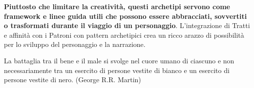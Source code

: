\begin{multicols}{2}
\begin{narratore}
\textbf{Piuttosto che limitare la creatività, questi archetipi servono come framework e linee guida utili che possono essere abbracciati, sovvertiti o trasformati durante il viaggio di un personaggio}. L'integrazione di Tratti e affinità con i Patroni con pattern archetipici crea un ricco arazzo di possibilità per lo sviluppo del personaggio e la narrazione.
\end{narratore}

\end{multicols}

\vfill

\begin{enfasi}
	La battaglia tra il bene e il male si svolge nel cuore umano di ciascuno e non necessariamente tra un esercito di persone vestite di bianco e un esercito di persone vestite di nero. (George R.R. Martin)
\end{enfasi}

\pagebreak

